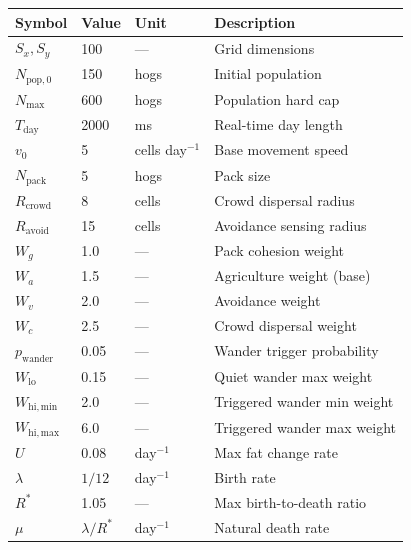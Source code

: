 \documentclass[11pt]{article}
\begin{document}
\begin{center}
\begin{tabular}{llll}
\toprule
Symbol & Value & Unit & Description \\
\midrule
$S_x, S_y$               & 100               & ---              & Grid dimensions \\
$N_{\mathrm{pop,0}}$     & 150               & hogs             & Initial population \\
$N_{\mathrm{max}}$       & 600               & hogs             & Population hard cap \\
$T_{\mathrm{day}}$       & 2000              & ms               & Real-time day length \\
$v_0$                    & 5                 & cells day$^{-1}$ & Base movement speed \\
$N_{\mathrm{pack}}$      & 5                 & hogs             & Pack size \\
$R_{\mathrm{crowd}}$     & 8                 & cells            & Crowd dispersal radius \\
$R_{\mathrm{avoid}}$     & 15                & cells            & Avoidance sensing radius \\
$W_g$                    & 1.0               & ---              & Pack cohesion weight \\
$W_a$                    & 1.5               & ---              & Agriculture weight (base) \\
$W_v$                    & 2.0               & ---              & Avoidance weight \\
$W_c$                    & 2.5               & ---              & Crowd dispersal weight \\
$p_{\mathrm{wander}}$    & 0.05              & ---              & Wander trigger probability \\
$W_{\mathrm{lo}}$        & 0.15              & ---              & Quiet wander max weight \\
$W_{\mathrm{hi,min}}$    & 2.0               & ---              & Triggered wander min weight \\
$W_{\mathrm{hi,max}}$    & 6.0               & ---              & Triggered wander max weight \\
$U$                      & 0.08              & day$^{-1}$       & Max fat change rate \\
$\lambda$                & $1/12$            & day$^{-1}$       & Birth rate \\
$R^*$                    & 1.05              & ---              & Max birth-to-death ratio \\
$\mu$                    & $\lambda / R^*$   & day$^{-1}$       & Natural death rate \\
\bottomrule
\end{tabular}
\end{center}
\end{document}
